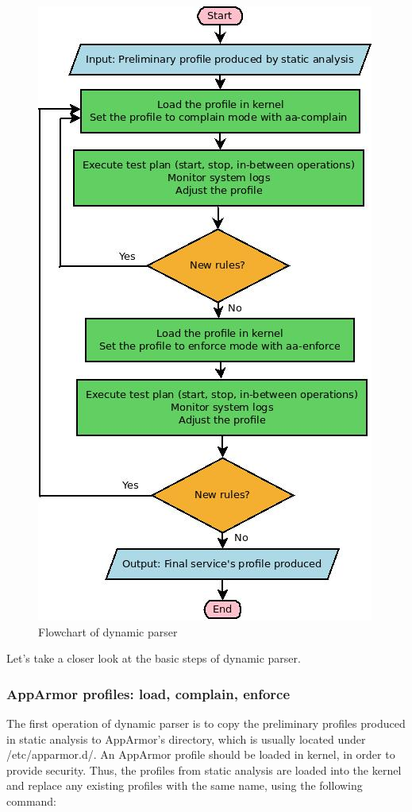 \begin{figure}[hp!]
  \centering
   \includegraphics[width=0.8\linewidth]{../figures/DynamicAlgo.jpeg}
   \caption{Flowchart of dynamic parser}
\end{figure}
Let's take a closer look at the basic steps of dynamic parser.

\subsubsection{AppArmor profiles: load, complain, enforce}
The first operation of dynamic parser is to copy the preliminary profiles produced in static analysis to AppArmor's directory, which is usually located under /etc/apparmor.d/. An AppArmor profile should be loaded in kernel, in order to provide security. Thus, the profiles from static analysis are loaded into the kernel and replace any existing profiles with the same name, using the following command:

